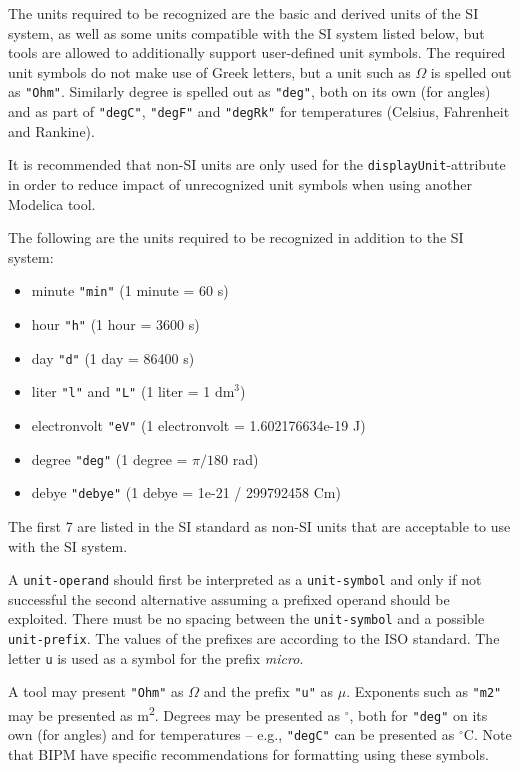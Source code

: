 The units required to be recognized are the basic and derived units of the SI system, as well as some units compatible with the SI system listed below, but tools are allowed to additionally support user-defined unit symbols.
The required unit symbols do not make use of Greek letters, but a unit such as $\Omega$ is spelled out as \lstinline!"Ohm"!.
Similarly degree is spelled out as \lstinline!"deg"!, both on its own (for angles) and as part of \lstinline!"degC"!, \lstinline!"degF"! and \lstinline!"degRk"! for temperatures (Celsius, Fahrenheit and Rankine).

It is recommended that non-SI units are only used for the \lstinline!displayUnit!-attribute in order to reduce impact of unrecognized unit symbols when using another Modelica tool.

The following are the units required to be recognized in addition to the SI system:
\begin{itemize}
\item minute \lstinline!"min"! (1 minute = 60 s)
\item hour \lstinline!"h"! (1 hour = 3600 s)
\item day \lstinline!"d"! (1 day = 86400 s)
\item liter \lstinline!"l"! and \lstinline!"L"! (1 liter = 1 $\text{dm}^{3}$)
\item electronvolt \lstinline!"eV"! (1 electronvolt = 1.602176634e-19 J)
\item degree \lstinline!"deg"! (1 degree = $\pi/180$ rad)
\item debye \lstinline!"debye"! (1 debye = 1e-21 / 299792458 Cm)
\end{itemize}
The first 7 are listed in the SI standard as non-SI units that are acceptable to use with the SI system.

A \lstinline[language=grammar]!unit-operand! should first be interpreted as a \lstinline[language=grammar]!unit-symbol! and only if not successful the second alternative assuming a prefixed operand should be exploited.
There must be no spacing between the \lstinline[language=grammar]!unit-symbol! and a possible \lstinline[language=grammar]!unit-prefix!.
The values of the prefixes are according to the ISO standard.
The letter \lstinline!u! is used as a symbol for the prefix \emph{micro}.

\begin{nonnormative}
A tool may present \lstinline!"Ohm"! as $\Omega$ and the prefix \lstinline!"u"! as $\mu$.
Exponents such as \lstinline!"m2"! may be presented as m\textsuperscript{2}.
Degrees may be presented as $^{\circ}$, both for \lstinline!"deg"! on its own (for angles) and for temperatures -- e.g., \lstinline!"degC"! can be presented as $^{\circ}$C.
Note that BIPM have specific recommendations for formatting using these symbols.
\end{nonnormative}

